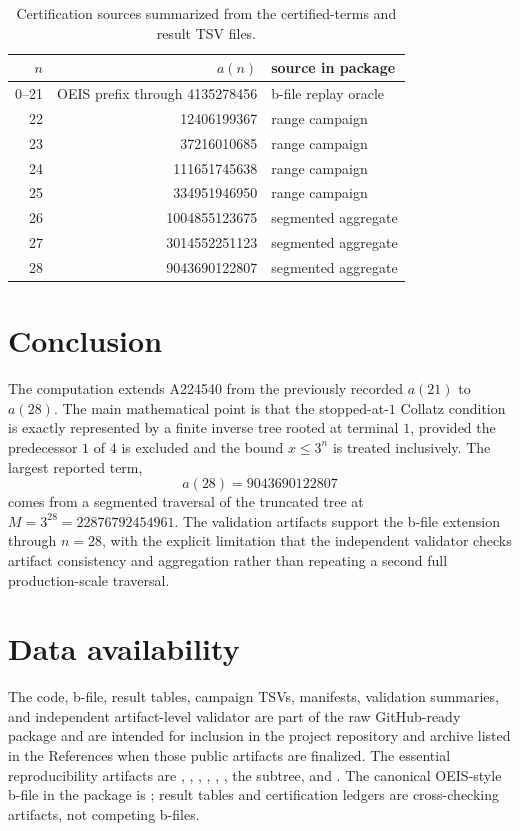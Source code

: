 \documentclass[11pt]{article}
\theoremstyle{definition}
\theoremstyle{remark}
\begin{document}
\begin{table}[ht]
\centering
\begin{tabular}{rrl}
\toprule
\(n\) & \(a(n)\) & source in package \\
\midrule
0--21 & OEIS prefix through 4135278456 & b-file replay oracle \\
22 & 12406199367 & range campaign \\
23 & 37216010685 & range campaign \\
24 & 111651745638 & range campaign \\
25 & 334951946950 & range campaign \\
26 & 1004855123675 & segmented aggregate \\
27 & 3014552251123 & segmented aggregate \\
28 & 9043690122807 & segmented aggregate \\
\bottomrule
\end{tabular}
\caption{Certification sources summarized from the certified-terms and result
TSV files.}
\label{tab:terms}
\end{table}

\section{Conclusion}

The computation extends A224540 from the previously recorded \(a(21)\) to
\(a(28)\).  The main mathematical point is that the stopped-at-\(1\) Collatz
condition is exactly represented by a finite inverse tree rooted at terminal
\(1\), provided the predecessor \(1\) of \(4\) is excluded and the bound
\(x\leq 3^n\) is treated inclusively.  The largest reported term,
\[
a(28)=9043690122807
\]
comes from a segmented traversal of the truncated tree at
\(M=3^{28}=22876792454961\).  The validation artifacts support the b-file
extension through \(n=28\), with the explicit limitation that the independent
validator checks artifact consistency and aggregation rather than repeating a
second full production-scale traversal.

\section*{Data availability}

The code, b-file, result tables, campaign TSVs, manifests, validation
summaries, and independent artifact-level validator are part of the raw
GitHub-ready package and are intended for inclusion in the project repository
and archive listed in the References when those public artifacts are finalized.
The essential reproducibility artifacts are ,
, ,
, ,
, the 
subtree, and .  The canonical
OEIS-style b-file in the package is ; result tables and
certification ledgers are cross-checking artifacts, not competing b-files.
\end{document}

